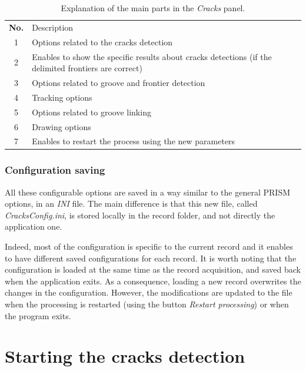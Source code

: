 \begin{table}[h!]
\begin{center}
\tabulinesep=3pt
\begin{tabu} to 0.8\textwidth {| c | X[m] |} %
    \everyrow{\hline}
    \hline
    \rowfont[c] \bfseries
        No. & Description \\
        1 & Options related to the cracks detection \\
        2 & Enables to show the specific results about cracks detections (if the delimited frontiers are correct) \\
        3 & Options related to groove and frontier detection \\
        4 & Tracking options \\
        5 & Options related to groove linking \\
        6 & Drawing options \\
        7 & Enables to restart the process using the new parameters \\
\end{tabu}
\end{center}
\caption{Explanation of the main parts in the \emph{Cracks} panel.}
\label{tab:autoguicontrols}
\end{table}

\subsubsection{Configuration saving}

All these configurable options are saved in a way similar to the general PRISM options, in an \emph{INI} file. The main difference is that this new file, called \emph{CracksConfig.ini}, is stored locally in the record folder, and not directly the application one.

Indeed, most of the configuration is specific to the current record and it enables to have different saved configurations for each record. It is worth noting that the configuration is loaded at the same time as the record acquisition, and saved back when the application exits. As a consequence, loading a new record overwrites the changes in the configuration. However, the modifications are updated to the file when the processing is restarted (using the button \emph{Restart processing}) or when the program exits.

\section{Starting the cracks detection}
\label{sec:setcrackdet}

